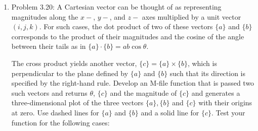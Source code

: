\documentclass[12pt]{amsart}
\begin{document}
\begin{enumerate}
If the coordinates lie within the first and fourth quadrants (i.e., $x > 0$), then
a simple formula can be used to compute $\theta$: $\theta = \tan^{-1}(y/x)$. The 
difficulty arises for the other cases. The following table summarizes the possibilities:
\[\begin{array}{l|l|l}
x & y & \theta \\ \hline
<0 & > 0 &  \tan^{-1}(y/x) + \pi \\
<0 & < 0 &   \tan^{-1}(y/x) - \pi \\
<0 & = 0 &  \pi \\
=0 & > 0 & \pi/2 \\
=0 & < 0 & -\pi/2 \\
=0 & = 0 & 0
\end{array}\]

Write a well-structured M-file using {\tt if...elseif} structures
to calculate $r$ and $\theta$ as a function of $x$ and $y$. Express
the final results for $\theta$ in degrees. Test your program by
evaluating the following cases:

\[\begin{array}{l|l|p{1cm}p{1cm}}
x & y & r & \theta \\ \hline
2 & 0 &  & \\
2 & 1 &  &  \\
0 & 3 &  & \\
-3 & 1 & & \\
-2 & 0 & & \\
-1 & -2 & & \\
0 & 0 & \\
0 & -2 & \\
2 & 2 & \\
\end{array}\]

\vspace{1cm}

\item Problem 3.20: A Cartesian vector can be thought of as representing
magnitudes along the $x-$, $y-$, and $z-$ axes multiplied by a unit vector $(i,j,k)$.
For such cases, the dot product of two of these vectors $\{a\}$ and $\{b\}$
corresponds to the product of their magnitudes and the cosine of the angle between
their tails as in $\{a \} \cdot \{b\} = ab \cos \theta$.

The cross product yields another vector, $\{c\} = \{a \} \times \{ b\}$, which
is perpendicular to the plane defined by $\{a\} $ and $\{ b\}$ such that its
direction is specified by the right-hand rule. Develop an M-file function
that is passed two such vectors and returns $\theta$, $\{c\}$ and the magnitude
of $\{c\}$ and generates a three-dimensional plot of the three vectors $\{a\},\{b\}$
and $\{c\}$ with their origins at zero. Use dashed lines for $\{a\}$ and $\{b\}$
and a solid line for $\{c\}$. Test your function for the following cases:


\end{enumerate}
\end{document}
